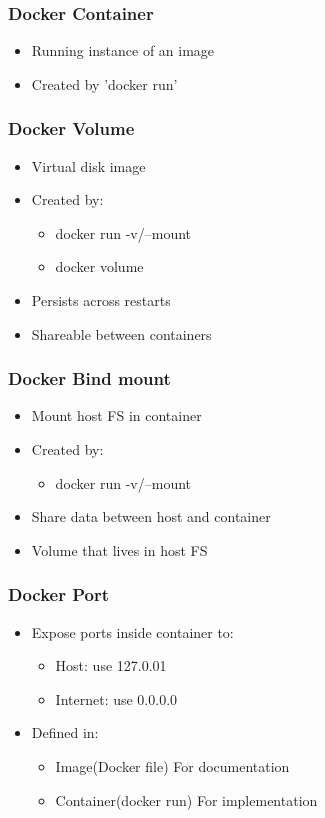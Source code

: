 \documentclass{article}
\begin{document}
\subsubsection{Docker Container}
\begin{itemize}
    \item Running instance of an image 
    \item Created by 'docker run'
\end{itemize}

\subsubsection{Docker Volume}
\begin{itemize}
    \item Virtual disk image
    \item Created by:
    \begin{itemize}
        \item docker run -v/--mount
        \item docker volume
    \end{itemize}
    \item Persists across restarts 
    \item Shareable between containers
\end{itemize}

\subsubsection{Docker Bind mount}
\begin{itemize}
    \item Mount host FS in container
    \item Created by:
    \begin{itemize}
        \item docker run -v/--mount 
    \end{itemize}
    \item Share data between host and container 
    \item Volume that lives in host FS 
\end{itemize}

\subsubsection{Docker Port}
\begin{itemize}
    \item Expose ports inside container to:
    \begin{itemize}
        \item Host: use 127.0.01
        \item Internet: use 0.0.0.0
    \end{itemize}
    \item Defined in:
    \begin{itemize}
        \item Image(Docker file) For documentation
        \item Container(docker run) For implementation
    \end{itemize}
\end{itemize}
\end{document}
